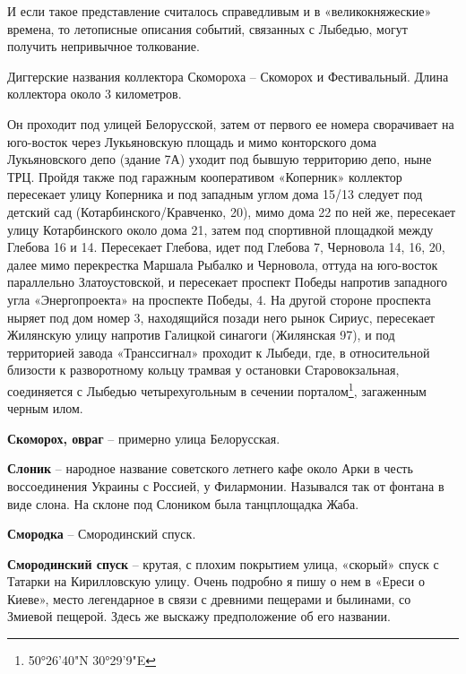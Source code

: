 И если такое представление считалось справедливым и в «великокняжеские» времена, то летописные описания событий, связанных с Лыбедью, могут получить непривычное толкование.

Диггерские названия коллектора Скомороха – Скоморох и Фестивальный. Длина коллектора около 3 километров.

Он проходит под улицей Белорусской, затем от первого ее номера сворачивает на юго-восток через Лукьяновскую площадь и мимо конторского дома Лукьяновского депо (здание 7А) уходит под бывшую территорию депо, ныне ТРЦ. Пройдя также под гаражным кооперативом «Коперник» коллектор пересекает улицу Коперника и под западным углом дома 15/13 следует под детский сад (Котарбинского/Кравченко, 20), мимо дома 22 по ней же, пересекает улицу Котарбинского около дома 21, затем под спортивной площадкой между Глебова 16 и 14. Пересекает Глебова, идет под Глебова 7, Черновола 14, 16, 20, далее мимо перекрестка Маршала Рыбалко и Черновола, оттуда на юго-восток параллельно Златоустовской, и пересекает проспект Победы напротив западного угла «Энергопроекта» на проспекте Победы, 4. На другой стороне проспекта ныряет под дом номер 3, находящийся позади него рынок Сириус, пересекает Жилянскую улицу напротив Галицкой синагоги (Жилянская 97), и под территорией завода «Транссигнал» проходит к Лыбеди, где, в относительной близости к разворотному кольцу трамвая у остановки Старовокзальная, соединяется с Лыбедью четырехугольным в сечении порталом\footnote{50°26'40"N 30°29'9"E}, загаженным черным илом.\\

\medskip

\textbf{Скоморох, овраг} – примерно улица Белорусская.\\

\medskip

\textbf{Слоник} – народное название советского летнего кафе около Арки в честь воссоединения Украины с Россией, у Филармонии. Назывался так от фонтана в виде слона. На склоне под Слоником была танцплощадка Жаба.\\

\medskip

\textbf{Смородка} – Смородинский спуск.\\
\medskip

\textbf{Смородинский спуск} – крутая, с плохим покрытием улица, «скорый» спуск с Татарки на Кирилловскую улицу. Очень подробно я пишу о нем в «Ереси о Киеве», место легендарное в связи с древними пещерами и былинами, со Змиевой пещерой. Здесь же выскажу предположение об его названии. 

